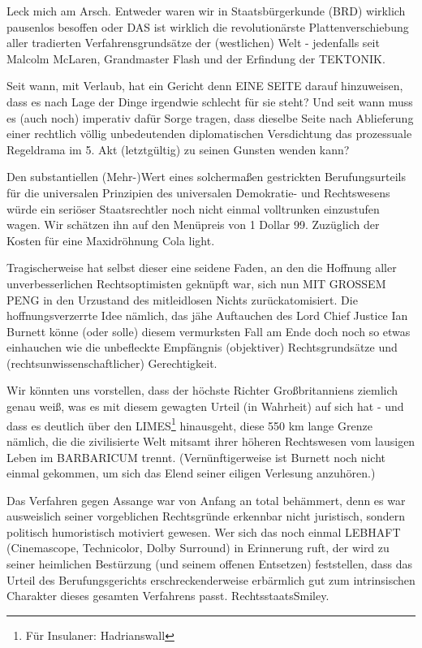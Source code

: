 \begin{multicols}{2}
Leck mich am Arsch. Entweder waren wir in Staatsbürgerkunde (BRD) wirklich pausenlos besoffen oder DAS
ist wirklich die revolutionärste Plattenverschiebung aller
tradierten Verfahrensgrundsätze der (westlichen) Welt
- jedenfalls seit Malcolm McLaren, Grandmaster Flash
und der Erfindung der TEKTONIK.

Seit wann, mit Verlaub, hat ein Gericht denn EINE SEITE
darauf hinzuweisen, dass es nach Lage der Dinge irgendwie schlecht für sie steht? Und seit wann muss es (auch
noch) imperativ dafür Sorge tragen, dass dieselbe Seite
nach Ablieferung einer rechtlich völlig unbedeutenden
diplomatischen Versdichtung das prozessuale Regeldrama im 5. Akt (letztgültig) zu seinen Gunsten wenden
kann?

Den substantiellen (Mehr-)Wert eines solchermaßen gestrickten Berufungsurteils für die universalen Prinzipien
des universalen Demokratie- und Rechtswesens würde
ein seriöser Staatsrechtler noch nicht einmal volltrunken einzustufen wagen. Wir schätzen ihn auf den Menüpreis von 1 Dollar 99. Zuzüglich der Kosten für eine
Maxidröhnung Cola light.

Tragischerweise hat selbst dieser eine seidene Faden,
an den die Hoffnung aller unverbesserlichen Rechtsoptimisten geknüpft war, sich nun MIT GROSSEM PENG
in den Urzustand des mitleidlosen Nichts zurückatomisiert. Die hoffnungsverzerrte Idee nämlich, das jähe Auftauchen des Lord Chief Justice Ian Burnett könne (oder
solle) diesem vermurksten Fall am Ende doch noch so
etwas einhauchen wie die unbefleckte Empfängnis (objektiver) Rechtsgrundsätze und (rechtsunwissenschaftlicher) Gerechtigkeit.

Wir könnten uns vorstellen, dass der höchste Richter
Großbritanniens ziemlich genau weiß, was es mit diesem gewagten Urteil (in Wahrheit) auf sich hat - und
dass es deutlich über den LIMES\footnote[33]{Für Insulaner: Hadrianswall} hinausgeht, diese 550
km lange Grenze nämlich, die die zivilisierte Welt mitsamt ihrer höheren Rechtswesen vom lausigen Leben
im BARBARICUM trennt. (Vernünftigerweise ist Burnett
noch nicht einmal gekommen, um sich das Elend seiner
eiligen Verlesung anzuhören.)

Das Verfahren gegen Assange war von Anfang an total
behämmert, denn es war ausweislich seiner vorgeblichen Rechtsgründe erkennbar nicht juristisch, sondern
politisch humoristisch motiviert gewesen. Wer sich das
noch einmal LEBHAFT (Cinemascope, Technicolor,
Dolby Surround) in Erinnerung ruft, der wird zu seiner
heimlichen Bestürzung (und seinem offenen Entsetzen) feststellen, dass das Urteil des Berufungsgerichts
erschreckenderweise erbärmlich gut zum intrinsischen
Charakter dieses gesamten Verfahrens passt. RechtsstaatsSmiley.


\end{multicols}
